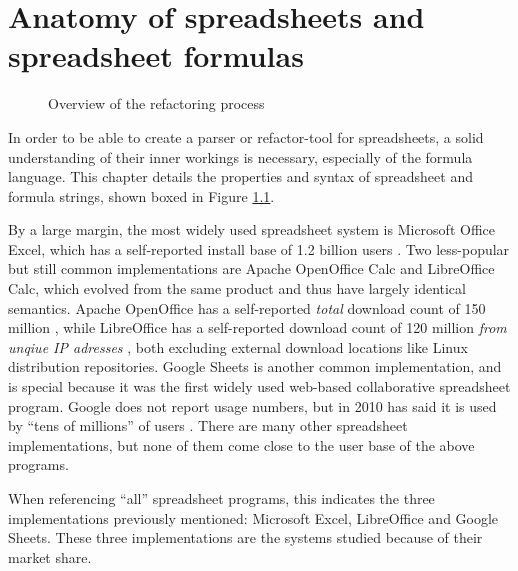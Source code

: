 
\chapter{Anatomy of spreadsheets and spreadsheet formulas}
\label{chapter:anatomy}

\noindent
\begin{figure}[h]
\centerfloat

\caption{Overview of the refactoring process}
\label{fig:chapteranatomyintrofigure}
\end{figure}


In order to be able to create a parser or refactor-tool for spreadsheets, a solid understanding of their inner workings is necessary, especially of the formula language.
This chapter details the properties and syntax of spreadsheet and formula strings, shown boxed in Figure \ref{fig:chapteranatomyintrofigure}.

By a large margin, the most widely used spreadsheet system is Microsoft Office Excel, which has a self-reported install base of 1.2 billion users \cite{microsoftByTheNumbers}.
Two less-popular but still common implementations are Apache OpenOffice Calc and LibreOffice Calc, which evolved from the same product and thus have largely identical semantics.
Apache OpenOffice has a self-reported \emph{total} download count of 150 million \cite{aoodownloadcount}, while LibreOffice has a self-reported download count of 120 million \emph{from unqiue IP adresses} \cite{libreofficedownloadcount}, both excluding external download locations like Linux distribution repositories.
Google Sheets is another common implementation, and is special because it was the first widely used web-based collaborative spreadsheet program.
Google does not report usage numbers, but in 2010 has said it is used by ``tens of millions'' of users \cite{googlsheetscount}.
There are many other spreadsheet implementations, but none of them come close to the user base of the above programs.

When referencing ``all'' spreadsheet programs, this indicates the three implementations previously mentioned: Microsoft Excel, LibreOffice and Google Sheets.
These three implementations are the systems studied because of their market share.

\newpage

